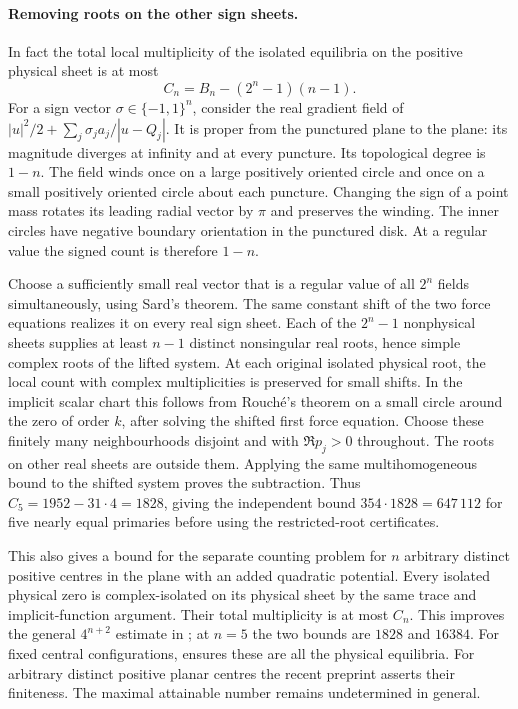 \documentclass[11pt]{article}
\begin{document}
\paragraph{Removing roots on the other sign sheets.}
In fact the total local multiplicity of the isolated equilibria on the positive physical sheet is at most
\[
 C_n=B_n-(2^n-1)(n-1).
\]
For a sign vector $\sigma\in\{-1,1\}^n$, consider the real gradient field of
$|u|^2/2+\sum_j \sigma_j a_j/|u-Q_j|$. It is proper from the punctured plane to the plane: its magnitude diverges at infinity and at every puncture. Its topological degree is $1-n$. The field winds once on a large positively oriented circle and once on a small positively oriented circle about each puncture. Changing the sign of a point mass rotates its leading radial vector by $\pi$ and preserves the winding. The inner circles have negative boundary orientation in the punctured disk. At a regular value the signed count is therefore $1-n$.

Choose a sufficiently small real vector that is a regular value of all $2^n$ fields simultaneously, using Sard's theorem. The same constant shift of the two force equations realizes it on every real sign sheet. Each of the $2^n-1$ nonphysical sheets supplies at least $n-1$ distinct nonsingular real roots, hence simple complex roots of the lifted system. At each original isolated physical root, the local count with complex multiplicities is preserved for small shifts. In the implicit scalar chart this follows from Rouch\'e's theorem on a small circle around the zero of order $k$, after solving the shifted first force equation. Choose these finitely many neighbourhoods disjoint and with $\Re p_j>0$ throughout. The roots on other real sheets are outside them. Applying the same multihomogeneous bound to the shifted system proves the subtraction. Thus $C_5=1952-31\cdot4=1828$, giving the independent bound $354\cdot1828=647\,112$ for five nearly equal primaries before using the restricted-root certificates.

This also gives a bound for the separate counting problem for $n$ arbitrary distinct positive centres in the plane with an added quadratic potential. Every isolated physical zero is complex-isolated on its physical sheet by the same trace and implicit-function argument. Their total multiplicity is at most $C_n$. This improves the general $4^{n+2}$ estimate in \cite{arust}; at $n=5$ the two bounds are $1828$ and $16384$. For fixed central configurations, \cite{hj} ensures these are all the physical equilibria. For arbitrary distinct positive planar centres the recent preprint \cite{zhou} asserts their finiteness. The maximal attainable number remains undetermined in general.
\end{document}
